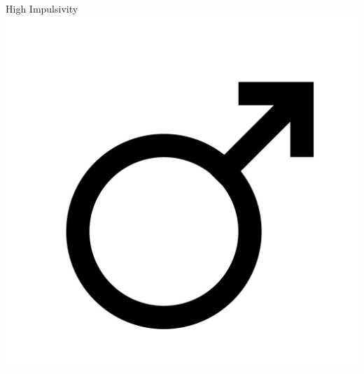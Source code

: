 \documentclass[aspectratio=169]{beamer}
\begin{document}
 \begin{frame}
	 \begin{center}
	     \Huge High Impulsivity \\
		\includegraphics[scale=.025]{./assets/men.png} \\
		\small \cite{langford93}
	 \end{center}
 \end{frame}
 
\end{document}
